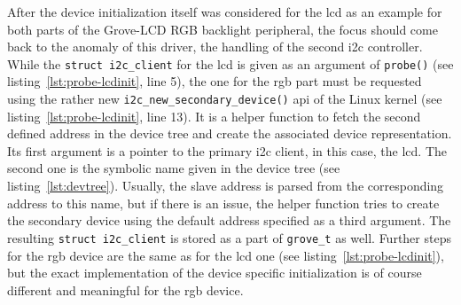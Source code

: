 After the device initialization itself was considered for the \ac{lcd} as an example for both parts of the Grove-LCD RGB backlight peripheral, the focus should come back to the anomaly of this driver, the handling of the second \ac{i2c} controller.
While the \texttt{struct i2c_client} for the \ac{lcd} is given as an argument of \texttt{probe()} (see listing~\ref{lst:probe-lcdinit}, line 5), the one for the \ac{rgb} part must be requested using the rather new \texttt{i2c_new_secondary_device()} \ac{api} of the Linux kernel (see listing~\ref{lst:probe-lcdinit}, line 13).
It is a helper function to fetch the second defined address in the device tree and create the associated device representation.
Its first argument is a pointer to the primary \ac{i2c} client, in this case, the \ac{lcd}.
The second one is the symbolic name given in the device tree (see listing~\ref{lst:devtree}).
Usually, the slave address is parsed from the corresponding address to this name, but if there is an issue, the helper function tries to create the secondary device using the default address specified as a third argument.
The resulting \texttt{struct i2c_client} is stored as a part of \texttt{grove_t} as well.
Further steps for the \ac{rgb} device are the same as for the \ac{lcd} one (see listing~\ref{lst:probe-lcdinit}), but the exact implementation of the device specific initialization is of course different and meaningful for the \ac{rgb} device.

